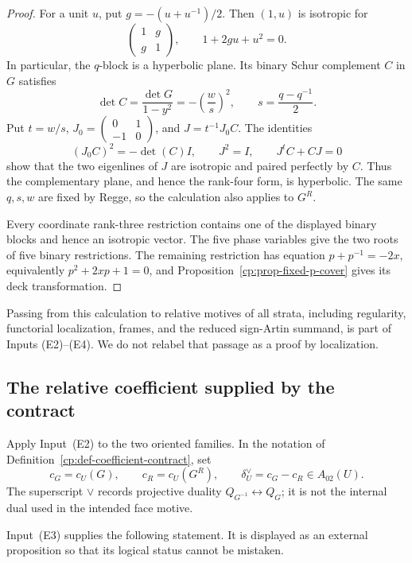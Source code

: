\begin{proof}
For a unit \(u\), put \(g=-(u+u^{-1})/2\).  Then \((1,u)\) is isotropic
for
\[
 \begin{pmatrix}1&g\\g&1\end{pmatrix},
\qquad 1+2gu+u^2=0.
\]
In particular, the \(q\)-block is a hyperbolic plane.  Its binary Schur
complement \(C\) in \(G\) satisfies
\[
 \det C=\frac{\det G}{1-y^2}
       =-\left(\frac ws\right)^2,
\qquad s=\frac{q-q^{-1}}2.
\]
Put \(t=w/s\), \(J_0=\left(\begin{smallmatrix}0&1\\-1&0\end{smallmatrix}\right)\),
and \(J=t^{-1}J_0C\).  The identities
\[
 (J_0C)^2=-\det(C)I,\qquad J^2=I,\qquad J^tC+CJ=0
\]
show that the two eigenlines of \(J\) are isotropic and paired perfectly by
\(C\).  Thus the complementary plane, and hence the rank-four form, is
hyperbolic.  The same \(q,s,w\) are fixed by Regge, so the calculation also
applies to \(G^R\).

Every coordinate rank-three restriction contains one of the displayed
binary blocks and hence an isotropic vector.  The five phase variables give
the two roots of five binary restrictions.  The remaining restriction has
equation \(p+p^{-1}=-2x\), equivalently \(p^2+2xp+1=0\), and
Proposition~\ref{cp:prop-fixed-p-cover} gives its deck transformation.
\end{proof}

Passing from this calculation to relative motives of all strata, including
regularity, functorial localization, frames, and the reduced sign-Artin
summand, is part of Inputs \textup{(E2)--(E4)}.  We do not relabel that
passage as a proof by localization.

\subsection{The relative coefficient supplied by the contract}

Apply Input~\textup{(E2)} to the two oriented families.  In the notation of
Definition~\ref{cp:def-coefficient-contract}, set
\[
 c_G=c_U(G),\qquad c_R=c_U(G^R),\qquad
 \delta_U^\vee=c_G-c_R\in A_{02}(U).
\]
The superscript \(\vee\) records projective duality
\(Q_{G^{-1}}\leftrightarrow Q_G\); it is not the internal dual used in the
intended face motive.

Input~\textup{(E3)} supplies the following statement.  It is displayed as
an external proposition so that its logical status cannot be mistaken.

